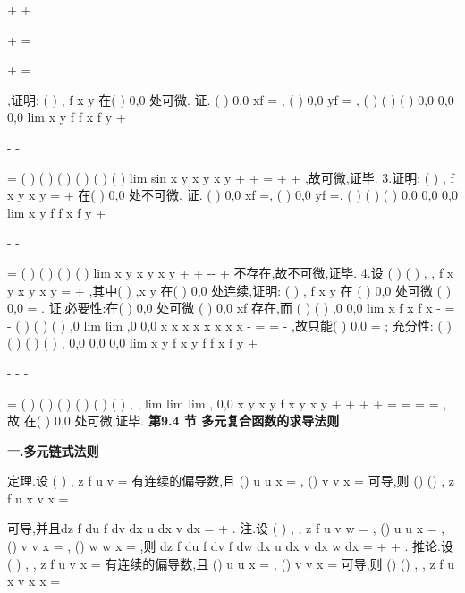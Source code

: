 +
+
\neq 

+
=

+
=

,证明:
(
)
,
f x y 在(
)
0,0 处可微. 
证.
(
)
0,0
xf
=
,
(
)
0,0
yf
=
,
(
)
(
)
(
)
0,0
0,0
0,0
lim
x
y
f
f
x
f
y
\rho 
\rho 
+
\to 


\Delta 
-
\Delta -
\Delta 

= 
(
)
(
)
(
)
(
)
(
)
(
)
lim
sin
x
y
x
y
x
y
\rho 
+
\to 
\Delta 
+\Delta 
=
\Delta 
+\Delta 
\Delta 
+\Delta 
,故可微,证毕. 
3.证明:
(
)
,
f
x y
x
y
=
+
在(
)
0,0 处不可微. 
证.
(
)
0,0
xf
=,
(
)
0,0
yf
=,
(
)
(
)
(
)
0,0
0,0
0,0
lim
x
y
f
f
x
f
y
\rho 
\rho 
+
\to 


\Delta 
-
\Delta -
\Delta 

= 
(
)
(
)
(
)
(
)
lim
x
y
x
y
x
y
\rho 
+
\to 
\Delta 
+\Delta 
-\Delta -\Delta 
\Delta 
+\Delta 
不存在,故不可微,证毕. 
4.设
(
)
(
)
,
,
f x y
x
y
x y
\varphi 
=
+
,其中(
)
,x y
\varphi 
在(
)
0,0 处连续,证明:
(
)
,
f x y 在 
(
)
0,0 处可微
(
)
0,0
\varphi 
\Leftrightarrow 
=
. 
证.必要性:在(
)
0,0 处可微
(
)
0,0
xf
\Rightarrow 
存在,而
(
)
(
)
,0
0,0
lim
x
f x
f
x
\to 
-
=
-
(
)
(
)
(
)
,0
lim
lim
,0
0,0
x
x
x
x
x
x
x
x
\varphi 
\varphi 
\varphi 
\to 
\to 
-
=
=\pm 
-
,故只能(
)
0,0
\varphi 
=
; 
充分性:
(
)
(
)
(
)
(
)
,
0,0
0,0
0,0
lim
x
y
f
x
y
f
f
x
f
y
\rho 
\rho 
+
\to 


\Delta 
\Delta 
-
-
\Delta -
\Delta 

= 
(
)
(
)
(
)
(
)
(
)
(
)
,
,
lim
lim
lim
,
0,0
x
y
x
y
f
x
y
x
y
\rho 
\rho 
\rho 
\varphi 
\varphi 
\varphi 
\rho 
\rho 
+
+
+
\to 
\to 
\to 
\Delta 
+\Delta 
\Delta 
\Delta 
\Delta 
\Delta 
=
=
\Delta 
\Delta 
=
=
,故 
在(
)
0,0 处可微,证毕. 
\vspace{6pt}
{\large \bfseries \textcolor{lyred}{第9.4 节 多元复合函数的求导法则}}

\vspace{4pt}
{\bfseries \textcolor{lyred}{一.多元链式法则}}

\textcolor{lyred}{定理}.设
(
)
,
z
f u v
=
有连续的偏导数,且
()
u
u x
=
,
()
v
v x
=
可导,则 
()
()
,
z
f u x
v x
=



可导,并且dz
f
du
f
dv
dx
u dx
v dx
\partial 
\partial 
=
\cdots 
+
\cdots 
\partial 
\partial 
. 
\textcolor{lyred}{注}.设
(
)
, ,
z
f u v w
=
,
()
u
u x
=
,
()
v
v x
=
,
()
w
w x
=
,则 
dz
f
du
f
dv
f
dw
dx
u dx
v dx
w dx
\partial 
\partial 
\partial 
=
\cdots 
+
\cdots 
+
\cdots 
\partial 
\partial 
\partial 
. 
\textcolor{lyred}{推论}.设
(
)
, ,
z
f u v x
=
有连续的偏导数,且
()
u
u x
=
,
()
v
v x
=
可导,则 
()
()
,
,
z
f u x
v x
x
=



